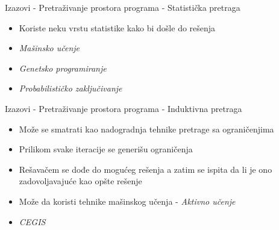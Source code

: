 \begin{frame}{Izazovi - Pretraživanje prostora programa - Statistička pretraga}
    \begin{itemize}
        \item Koriste neku vrstu statistike kako bi došle do rešenja
        \item \emph{Mašinsko učenje}
        \item \emph{Genetsko programiranje}
        \item \emph{Probabilističko zaključivanje}
    \end{itemize}
\end{frame}


\begin{frame}{Izazovi - Pretraživanje prostora programa - Induktivna pretraga}
    \begin{itemize}
        \item Može se smatrati kao nadogradnja tehnike pretrage sa ograničenjima
        \item Prilikom svake iteracije se generišu ograničenja
        \item Rešavačem se dođe do mogućeg rešenja a zatim se ispita da li je ono zadovoljavajuće kao opšte rešenje
        \item Može da koristi tehnike mašinskog učenja - \emph{Aktivno učenje}
        \item \emph{CEGIS}
    \end{itemize}
\end{frame}

